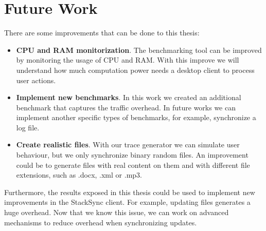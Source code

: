 \section{Future Work}
There are some improvements that can be done to this thesis:

\begin{itemize}
	\item \textbf{CPU and RAM monitorization}. The benchmarking tool can be improved by monitoring
	the usage of CPU and RAM. With this improve we will understand how much computation power
	needs a desktop client to process user actions.
	\item \textbf{Implement new benchmarks}. In this work we created an additional benchmark that captures
	the traffic overhead. In future works we can implement another specific types of benchmarks, for example,
	synchronize a log file.
	\item \textbf{Create realistic files}. With our trace generator we can simulate user behaviour, but
	we only synchronize binary random files. An improvement could be to generate files with real content
	on them and with different file extensions, such as .docx, .xml or .mp3.
\end{itemize}

Furthermore, the results exposed in this thesis could be used to implement new improvements in the StackSync
client. For example, updating files generates a huge overhead. Now that we know this issue, we can work
on advanced mechanisms to reduce overhead when synchronizing updates.